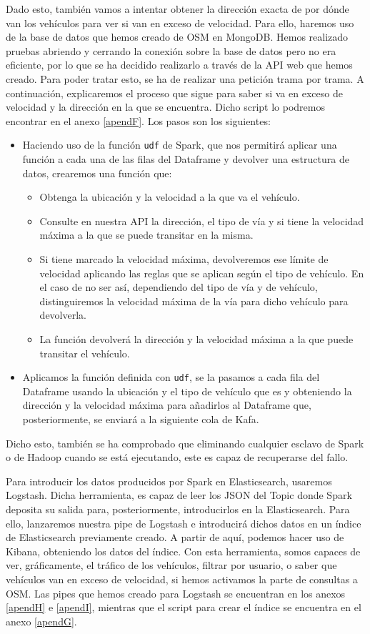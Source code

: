 Dado esto, también vamos a intentar obtener la dirección exacta de por
dónde van los vehículos para ver si van en exceso de velocidad. Para ello,
haremos uso de la base de datos que hemos creado de OSM en MongoDB. Hemos
realizado pruebas abriendo y cerrando la conexión sobre la base de datos
pero no era eficiente, por lo que se ha decidido realizarlo a través de la
API web que hemos creado. Para poder tratar esto, se ha de realizar una
petición trama por trama. A continuación, explicaremos el proceso que sigue
para saber si va en exceso de velocidad y la dirección en la que se
encuentra. Dicho script lo podremos encontrar en el anexo \ref{apendF}. Los
pasos son los siguientes:

\begin{itemize}
\item Haciendo uso de la función {\tt udf} de Spark, que nos permitirá
  aplicar una función a cada una de las filas del Dataframe y devolver una
  estructura de datos, crearemos una función que:
  \begin{itemize}
  \item Obtenga la ubicación y la velocidad a la que va el vehículo.
  \item Consulte en nuestra API la dirección, el tipo de vía y si tiene la
    velocidad máxima a la que se puede transitar en la misma.
  \item Si tiene marcado la velocidad máxima, devolveremos ese límite de
    velocidad aplicando las reglas que se aplican según el tipo de
    vehículo. En el caso de no ser así, dependiendo del tipo de vía y de
    vehículo, distinguiremos la velocidad máxima de la vía para dicho
    vehículo para devolverla.
  \item La función devolverá la dirección y la velocidad máxima a la que
    puede transitar el vehículo.
  \end{itemize}
\item Aplicamos la función definida con {\tt udf}, se la pasamos a cada
  fila del Dataframe usando la ubicación y el tipo de vehículo que es y
  obteniendo la dirección y la velocidad máxima para añadirlos al Dataframe
  que, posteriormente, se enviará a la siguiente cola de Kafa.
\end{itemize}

Dicho esto, también se ha comprobado que eliminando cualquier esclavo de
Spark o de Hadoop cuando se está ejecutando, este es capaz de recuperarse
del fallo.

Para introducir los datos producidos por Spark en Elasticsearch, usaremos
Logstash. Dicha herramienta, es capaz de leer los JSON del Topic donde
Spark deposita su salida para, posteriormente, introducirlos en la
Elasticsearch. Para ello, lanzaremos nuestra pipe de Logstash e introducirá
dichos datos en un índice de Elasticsearch previamente creado. A partir de
aquí, podemos hacer uso de Kibana, obteniendo los datos del índice. Con
esta herramienta, somos capaces de ver, gráficamente, el tráfico de los
vehículos, filtrar por usuario, o saber que vehículos van en exceso de
velocidad, si hemos activamos la parte de consultas a OSM. Las pipes que
hemos creado para Logstash se encuentran en los anexos \ref{apendH} e
\ref{apendI}, mientras que el script para crear el índice se encuentra en
el anexo \ref{apendG}.

